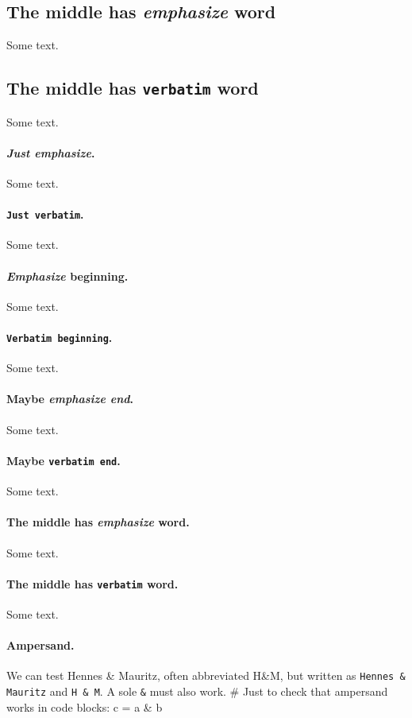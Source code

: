 \documentclass[%
oneside,                 %
final,                   %
10pt]{article}
\theoremstyle{definition}
\begin{document}
\begin{enumerate}
\subsection{The middle has \emph{emphasize} word}
Some text.
\subsection{The middle has \texttt{verbatim} word}
Some text.
\paragraph{\emph{Just emphasize}.}
Some text.
\paragraph{\texttt{Just verbatim}.}
Some text.
\paragraph{\emph{Emphasize} beginning.}
Some text.
\paragraph{\texttt{Verbatim beginning}.}
Some text.
\paragraph{Maybe \emph{emphasize end}.}
Some text.
\paragraph{Maybe \texttt{verbatim end}.}
Some text.
\paragraph{The middle has \emph{emphasize} word.}
Some text.
\paragraph{The middle has \texttt{verbatim} word.}
Some text.
\paragraph{Ampersand.}
We can test Hennes {\&} Mauritz, often abbreviated H{\&}M, but written
as \Verb!Hennes & Mauritz! and \Verb!H & M!.
A sole \Verb!&! must also work.
\bccq
# Just to check that ampersand works in code blocks:
c = a & b


\end{enumerate}
\end{document}
